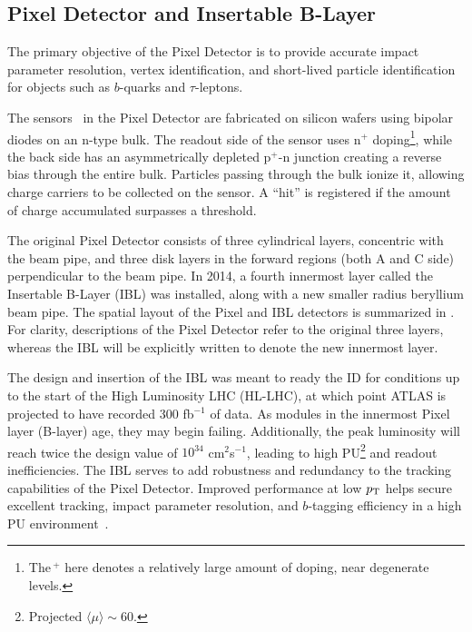%
\subsection{Pixel Detector and Insertable B-Layer}
The primary objective of the Pixel Detector is to provide accurate impact parameter resolution, vertex identification, and short-lived particle identification for objects such as $b$-quarks and $\tau$-leptons.

The sensors~\cite{Pixel_Sensors} in the Pixel Detector are fabricated on silicon wafers using bipolar diodes on an n-type bulk. The readout side of the sensor uses n$^+$ doping\footnote{
	The\,$^{+}$ here denotes a relatively large amount of doping, near degenerate levels.
}, while the back side has an asymmetrically depleted p$^+$-n junction creating a reverse bias through the entire bulk. Particles passing through the bulk ionize it, allowing charge carriers to be collected on the sensor. A ``hit'' is registered if the amount of charge accumulated surpasses a threshold.


The original Pixel Detector consists of three cylindrical layers,
concentric with the beam pipe, and three disk layers in the forward regions (both A and C side) perpendicular to the beam pipe. In 2014, a fourth innermost layer called the Insertable B-Layer (IBL) was installed, along with a new smaller radius beryllium beam pipe.
The spatial layout of the Pixel and IBL detectors is summarized in \Tab{\ref{tab:pixel_config}}. For clarity, descriptions of the Pixel Detector refer to the original three layers, whereas the IBL will be explicitly written to denote the new innermost layer.

The design and insertion of the IBL was meant to ready the ID for conditions up to the start of the High Luminosity LHC (HL-LHC), at which point ATLAS is projected to have recorded 300 fb$^{-1}$ of data. As modules in the innermost Pixel layer (B-layer) age, they may begin failing. Additionally, the peak luminosity will reach twice the design value of $10^{34}$ cm$^2$s$^{-1}$, leading to high PU\footnote{
	Projected $\langle\mu\rangle\sim 60$.
} and readout inefficiencies. The IBL serves to add robustness and redundancy to the tracking capabilities of the Pixel Detector. Improved performance at low $p_{\rm T}$ helps secure excellent tracking, impact parameter resolution, and $b$-tagging efficiency in a high PU environment~\cite{ID_RUN2_PROC}. 


